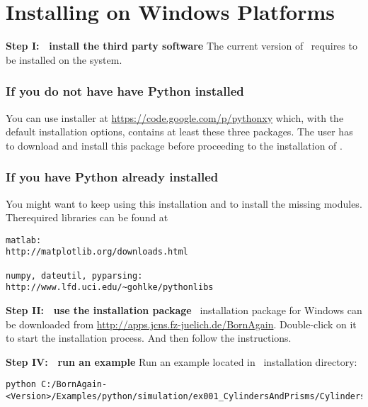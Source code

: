 \section{Installing on Windows Platforms} 


\noindent
{\bf Step I: $~$ install the third party software} \newline
The current version of \BornAgain\ requires  
to be installed on the system. 

\subsubsection{If you do not have have Python installed}
You can use  installer
at \url{https://code.google.com/p/pythonxy} which, with the default installation options, contains at least these three packages.
The user has to download and install this package before proceeding to
the installation of \BornAgain.
\vspace*{2mm}


\subsubsection{If you have Python already installed}
You might want to keep using this installation and to install the missing modules. Therequired libraries can be found at
\begin{lstlisting}[language=shell, style=commandline]
matlab:
http://matplotlib.org/downloads.html

numpy, dateutil, pyparsing:
http://www.lfd.uci.edu/~gohlke/pythonlibs
\end{lstlisting}


\noindent
{\bf Step II: $~$ use the installation package } \newline
\BornAgain\ installation package for Windows can be downloaded from \url{http://apps.jcns.fz-juelich.de/BornAgain}.
Double-click on it to start the installation process. And then follow the instructions.
\vspace*{2mm}

\noindent
{\bf Step IV: $~$ run an example} \newline
Run an example located in \BornAgain\ installation directory:
\begin{lstlisting}[language=shell, style=commandline]
python C:/BornAgain-<Version>/Examples/python/simulation/ex001_CylindersAndPrisms/CylindersAndPrisms.py
\end{lstlisting}





